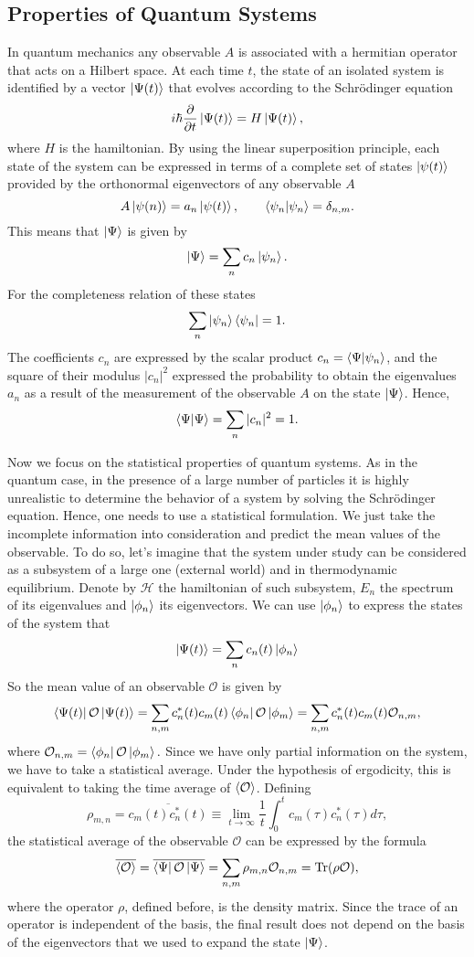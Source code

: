 \documentclass[10pt]{article}
\begin{document}
	\subsection{Properties of Quantum Systems}
	In quantum mechanics any observable $A$ is associated with a hermitian operator that acts on a Hilbert space. At each time $t$, the state of an isolated system is identified by a vector $\ket{\Psi(t)}$ that evolves according to the Schrödinger equation 
	$$i\hbar\pdv{}{t}\ket{\Psi(t)}=H\ket{\Psi(t)},$$
	where $H$ is the hamiltonian. By using the linear superposition principle, each state of the system can be expressed in terms of a complete set of states $\ket{\psi(t)}$ provided by the orthonormal eigenvectors of any observable $A$
	$$A\ket{\psi(n)}=a_n\ket{\psi(t)},\qquad \bra{\psi_n}\ket{\psi_n}=\delta_{n,m}.$$ 
	This means that $\ket{\Psi}$ is given by 
	$$\ket{\Psi}=\sum_nc_n\ket{\psi_n}.$$
	For the completeness relation of these states 
	$$\sum_n\ket{\psi_n}\bra{\psi_n}=1.$$
	The coefficients $c_n$ are expressed by the scalar product $c_n=\bra{\Psi}\ket{\psi_n}$, and the square of their modulus $|c_n|^2$ expressed the probability to obtain the eigenvalues $a_n$ as a result of the measurement of the observable $A$ on the state $\ket{\Psi}$. Hence,
	$$\bra{\Psi}\ket{\Psi}=\sum_n|c_n|^2=1.$$
	
	Now we focus on the statistical properties of quantum systems. As in the quantum case, in the presence of a large number of particles it is highly unrealistic to determine the behavior of a system by solving the Schrödinger equation. Hence, one needs to use a statistical formulation. We just take the incomplete information into consideration and predict the mean values of the observable. To do so, let's imagine that the system under study can be considered as a subsystem of a large one (external world) and in thermodynamic equilibrium. Denote by $\mathcal{H}$ the hamiltonian of such subsystem, $E_n$ the spectrum of its eigenvalues and $\ket{\phi_n}$ its eigenvectors. We can use $\ket{\phi_n}$ to express the states of the system that 
	$$\ket{\Psi(t)}=\sum_nc_n(t)\ket{\phi_n}$$
	So the mean value of an observable $\mathcal{O}$ is given by 
	$$\bra{\Psi(t)}\mathcal{O}\ket{\Psi(t)}=\sum_{n,m}c_n^*(t)c_m(t)\bra{\phi_n}\mathcal{O}\ket{\phi_m}=\sum_{n,m}c_n^*(t)c_m(t)\mathcal{O}_{n,m},$$
	where $\mathcal{O}_{n,m}=\bra{\phi_n}\mathcal{O}\ket{\phi_m}.$ Since we have only partial information on the system, we have to take a statistical average. Under the hypothesis of ergodicity, this is equivalent to taking the time average of $\expval{\mathcal{O}}$. Defining
	$$\rho_{m,n}=\overline{c_m(t)c_n^*(t)}\equiv\lim_{t\rightarrow\infty}\frac{1}{t}\int_0^tc_m(\tau)c_n^*(\tau)d\tau,$$
	the statistical average of the observable $\mathcal{O}$ can be expressed by the formula 
	$$\overline{\expval{\mathcal{O}}}=\overline{\bra{\Psi}\mathcal{O}\ket{\Psi}}=\sum_{n,m}\rho_{m,n}\mathcal{O}_{n,m}=\Tr(\rho\mathcal{O}),$$
	where the operator $\rho$, defined before, is the density matrix. Since the trace of an operator is independent of the basis, the final result does not depend on the basis of the eigenvectors that we used to expand the state $\ket{\Psi}$. 
	
\end{document}
